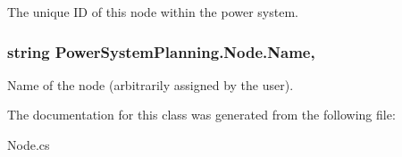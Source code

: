 The unique ID of this node within the power system. 

\subsubsection[{\texorpdfstring{Name}{Name}}]{\setlength{\rightskip}{0pt plus 5cm}string Power\+System\+Planning.\+Node.\+Name\hspace{0.3cm}{\ttfamily [get]}, {\ttfamily [set]}}\hypertarget{class_power_system_planning_1_1_node_ac793185992fc6c55ca5e1880f4947e57}{}\label{class_power_system_planning_1_1_node_ac793185992fc6c55ca5e1880f4947e57}


Name of the node (arbitrarily assigned by the user). 



The documentation for this class was generated from the following file\+:\begin{DoxyCompactItemize}
\item 
Node.\+cs\end{DoxyCompactItemize}
